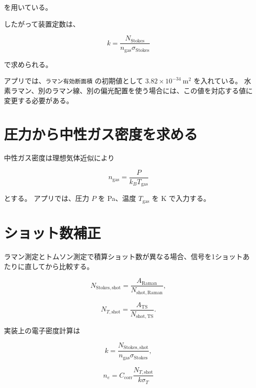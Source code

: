 \documentclass[uplatex,dvipdfmx,11pt]{jsarticle}
\begin{document}
を用いている。

したがって装置定数は、

\begin{equation}
k =
\frac{N_{\mathrm{Stokes}}}
{n_{\mathrm{gas}}\sigma_{\mathrm{Stokes}}}
\end{equation}

で求められる。

アプリでは、\texttt{ラマン有効断面積} の初期値として $3.82\times10^{-34}\ \mathrm{m^2}$ を入れている。
水素ラマン、別のラマン線、別の偏光配置を使う場合には、この値を対応する値に変更する必要がある。

\section{圧力から中性ガス密度を求める}

中性ガス密度は理想気体近似により

\begin{equation}
n_{\mathrm{gas}}
=
\frac{P}{k_B T_{\mathrm{gas}}}
\end{equation}

とする。
アプリでは、圧力 $P$ を \si{Pa}、温度 $T_{\mathrm{gas}}$ を \si{K} で入力する。

\section{ショット数補正}

ラマン測定とトムソン測定で積算ショット数が異なる場合、信号を1ショットあたりに直してから比較する。

\begin{equation}
N_{\mathrm{Stokes,shot}}
=
\frac{A_{\mathrm{Raman}}}
{N_{\mathrm{shot,Raman}}},
\end{equation}

\begin{equation}
N_{T,\mathrm{shot}}
=
\frac{A_{\mathrm{TS}}}
{N_{\mathrm{shot,TS}}}.
\end{equation}

実装上の電子密度計算は

\begin{equation}
k =
\frac{N_{\mathrm{Stokes,shot}}}
{n_{\mathrm{gas}}\sigma_{\mathrm{Stokes}}},
\end{equation}

\begin{equation}
n_e =
C_{\mathrm{corr}}
\frac{N_{T,\mathrm{shot}}}
{k\sigma_T}
\end{equation}
\end{document}
